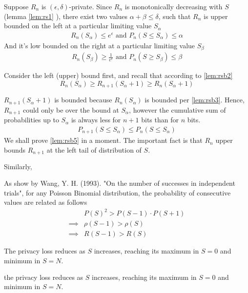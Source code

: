\documentclass[11pt]{article}
\begin{document}
Suppose $R_n$ is $(\epsilon, \delta)$-private. Since $R_n$ is monotonically decreasing with $S$ (lemma  \eqref{lem:rs1} ), there exist two values $\alpha + \beta \le \delta$, such that $R_n$ is upper bounded on the left at a particular limiting value $S_\alpha$ 
 \begin{align}  \label{lem:rsb3}
 R_n(S_\alpha) \le e^\epsilon \text{ and } P_n(S \le S_\alpha) \le \alpha 
\end{align}
And it's low bounded on the right at a particular limiting value $S_\beta$
 \begin{align}  \label{lem:rsb4}
 R_n(S_\beta) \ge \frac{1}{e^\epsilon} \text{ and } P_n(S \ge S_\beta) \le \beta
\end{align}
 
Consider the left (upper) bound first, and recall that according to \eqref{lem:rsb2}
\[
 R_n(S_\alpha) \ge R_{n+1}(S_\alpha+1) \ge R_n(S_\alpha+1)
 \]
 
$R_{n+1}(S_\alpha+1)$ is bounded because  $R_n(S_\alpha)$ is bounded per \eqref{lem:rsb3}.  Hence, $R_{n+1}$ could only be over the bound at $S_\alpha$, however the cumulative sum of probabilities up to $S_\alpha$ is always less for $n+1$ bits than for $n$ bits.
 \begin{align}  \label{lem:rsb5}
P_{n+1}(S \le S_\alpha) \le P_{n}(S \le S_\alpha)
\end{align}
We shall prove \eqref{lem:rsb5} in a moment. The important fact is that $R_n$ upper bounds $R_{n+1}$ at the left tail of distribution of $S$. 

Similarly, 
 
 
 As show by Wang, Y. H. (1993). "On the number of successes in independent trials", for any Poisson Binomial distribution, the probability of consecutive values are related as follows
 \begin{align*}
 & P(S)^2  > P(S-1) \cdot P(S+1) \\
\implies &  \rho(S-1) > \rho(S) \\
\implies & R(S-1) > R(S)
\end{align*}



\begin{lem} \label{lem:rsreduce}
 The privacy loss reduces as $S$ increases, reaching its maximum in $S=0$ and minimum in $S=N$.
\end{lem}

 the privacy loss reduces as $S$ increases, reaching its maximum in $S=0$ and minimum in $S=N$.
\end{document}
